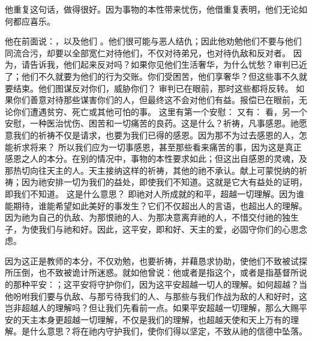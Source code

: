  他重复这句话，做得很好。因为事物的本性带来忧伤，他借重复表明，他们无论如何都应喜乐。\par

 他在前面说：，以及他们  。他们很可能与恶人结仇；因此他劝勉他们不要与他们同流合污，却要以全部宽仁对待他们，不仅对待弟兄，也对待仇敌和反对者。 因为，请告诉我，他们起来反对吗？如果你见他们生活奢华，为什么忧愁？审判已近了；他们不久就要为他们的行为交账。你们受困苦，他们享奢华？但这些事不久就要结束。他们图谋反对你们，威胁你们？ 审判已在眼前，那时这些都将反转。 如果你们善意对待那些谋害你们的人，但最终这不会对他们有益。报偿已在眼前，无论你们遭遇贫穷、死亡或其他可怕的事。 这里有第一个安慰： 又有：  看，另一个安慰，一种医治忧伤、困苦和一切痛苦的良药。这是什么？祈祷，凡事感恩。祂愿意我们的祈祷不仅是请求，也要为我们已得的感恩。因为那不为过去感恩的人，怎能祈求将来？ 所以我们应为一切事感恩，甚至那些看来痛苦的事，因为这是真正感恩之人的本分。在别的情况中，事物的本性要求如此；但这出自感恩的灵魂，及那热切向往天主的人。天主接纳这样的祈祷，其他的祂不承认。献上可蒙悦纳的祈祷；因为祂安排一切为我们的益处，即使我们不知道。这就是它大有益处的证明，即我们不知道。 这是什么意思？ 即祂对人所成就的和平，超越一切理解。因为谁能期待，谁能希望如此美好的事发生？它们不仅超出人的言语，也超出人的理解。因为祂为自己的仇敌、为那恨祂的人、为那决意离弃祂的人，不惜交付祂的独生子，为使我们与祂和好。因此，这平安，即和好、天主的爱，必固守你们的心思念虑。\par

因为这正是教师的本分，不仅劝勉，也要祈祷，并藉恳求协助，使他们不致被试探所压倒，也不致被诡计所迷惑。就如他曾说：他或者是指这个，或者是指基督所说的那种平安：；这平安将守护你们，因为这平安超越一切人的理解。如何超越？当他吩咐我们要与仇敌、与那亏待我们的人、与那些与我们作战为敌的人和好时，这岂非超越人的理解吗？但让我们先看前一点。如果平安超越一切理解，那么大赐平安的天主本身更超越一切理解，不仅是我们的理解，也超越天使和天上万有的理解。是什么意思？将在祂内守护我们，使你们得以坚定，不致从祂的信德中坠落。\par

